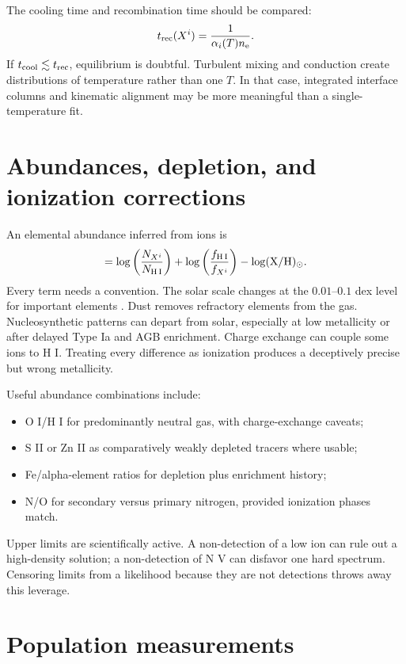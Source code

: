 The cooling time and recombination time should be compared:
\begin{equation}
 t_{\rm rec}(X^i)=\frac{1}{\alpha_{i}(T)n_{\rm e}}.
\end{equation}
If $t_{\rm cool}\lesssim t_{\rm rec}$, equilibrium is doubtful. Turbulent
mixing and conduction create distributions of temperature rather than one
$T$. In that case, integrated interface columns and kinematic alignment may
be more meaningful than a single-temperature fit.

\section{Abundances, depletion, and ionization corrections}

An elemental abundance inferred from ions is
\begin{equation}
 [{\rm X/H}]=
 \log\left(\frac{N_{X^i}}{N_{\rm H\,I}}\right)
 +\log\left(\frac{f_{\rm H\,I}}{f_{X^i}}\right)
 -\log({\rm X/H})_\odot.
 \label{eq:abs-ionic-abundance}
\end{equation}
Every term needs a convention. The solar scale changes at the
$0.01$--$0.1$ dex level for important elements \citep{Asplund2021}. Dust
removes refractory elements from the gas. Nucleosynthetic patterns can depart
from solar, especially at low metallicity or after delayed Type Ia and AGB
enrichment. Charge exchange can couple some ions to H I. Treating every
difference as ionization produces a deceptively precise but wrong
metallicity.

Useful abundance combinations include:
\begin{itemize}
  \item O I/H I for predominantly neutral gas, with charge-exchange caveats;
  \item S II or Zn II as comparatively weakly depleted tracers where usable;
  \item Fe/alpha-element ratios for depletion plus enrichment history;
  \item N/O for secondary versus primary nitrogen, provided ionization phases
  match.
\end{itemize}
Upper limits are scientifically active. A non-detection of a low ion can rule
out a high-density solution; a non-detection of N V can disfavor one hard
spectrum. Censoring limits from a likelihood because they are not detections
throws away this leverage.

\section{Population measurements}

